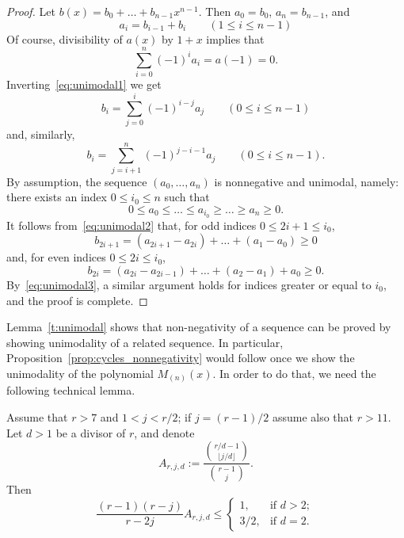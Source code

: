 \begin{proof}
    Let $b(x) = b_0 + \ldots + b_{n-1} x^{n-1}$.
    Then $a_0 = b_0$, $a_n = b_{n-1}$, and
    \begin{equation}\label{eq:unimodal1}
        a_i = b_{i-1} + b_i 
        \qquad (1 \le i \le n-1)
    \end{equation}
    Of course, divisibility of $a(x)$ by $1+x$ implies that
    \[
        \sum_{i=0}^{n} (-1)^i a_i = a(-1) = 0.
    \]
    Inverting~\eqref{eq:unimodal1} we get
    \begin{equation}\label{eq:unimodal2}
        b_i = \sum_{j=0}^i (-1)^{i-j} a_j
        \qquad (0 \le i \le n-1)
    \end{equation}
    and, similarly,
    \begin{equation}\label{eq:unimodal3}
        b_i = \sum_{j=i+1}^n (-1)^{j-i-1} a_j
        \qquad (0 \le i \le n-1).
    \end{equation}
    By assumption, the sequence $(a_0, \ldots, a_n)$ is nonnegative and unimodal, namely: 
    there exists an index $0 \le i_0 \le n$ such that
    \[
        0 \le a_0 \le \ldots \le a_{i_0} \ge \ldots \ge a_n \ge 0.
    \]
    It follows from~\eqref{eq:unimodal2} that, for odd indices $0 \le 2i+1 \le i_0$,
    \[
        b_{2i+1} = (a_{2i+1} - a_{2i}) + \ldots + (a_1 - a_0) \ge 0
    \]
    and, for even indices $0 \le 2i \le i_0$,
    \[
        b_{2i} = (a_{2i} - a_{2i-1}) + \ldots + (a_2 - a_1) + a_0 \ge 0.
    \]
    By~\eqref{eq:unimodal3}, a similar argument holds for 
    indices greater or equal to $i_0$, and the proof is complete.
\end{proof}
	
Lemma~\ref{t:unimodal} shows that non-negativity of a sequence can be proved by showing unimodality of a related sequence. In particular, Proposition~\ref{prop:cycles_nonnegativity} would follow once we show the unimodality of the polynomial $M_{(n)}(x)$.
In order to do that, we need the following technical lemma.

\begin{lemma}\label{lem:binomial_approx}
    Assume that $r > 7$ and $1 < j < r/2$;
    if $j = (r-1)/2$ assume also that $r > 11$.
    Let $d > 1$ be a divisor of $r$, and denote
	\[
	   A_{r,j,d} 
	   := \frac{\displaystyle\binom{r/d - 1} {\lfloor j/d \rfloor}} {\displaystyle\binom{r-1}{j}}.
	\]
	Then
	\[
	\frac{(r-1)(r-j)}{r-2j} A_{r,j,d} \le 
	\begin{cases}
	        1, &\text{if } d>2; \\
	        3/2, &\text{if } d=2.
	\end{cases}
	\]
\end{lemma}
	
